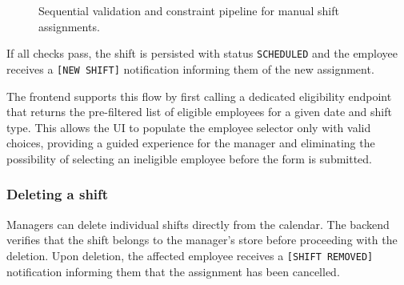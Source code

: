 \begin{figure}[!h]
    \caption{Sequential validation and constraint pipeline for manual shift assignments.}
    \label{fig:manual_assignment_pipeline}
\end{figure}

\par If all checks pass, the shift is persisted with status \texttt{SCHEDULED} and the employee receives a \texttt{[NEW SHIFT]} notification informing them of the new assignment.

\par The frontend supports this flow by first calling a dedicated eligibility endpoint that returns the pre-filtered list of eligible employees for a given date and shift type. This allows the UI to populate the employee selector only with valid choices, providing a guided experience for the manager and eliminating the possibility of selecting an ineligible employee before the form is submitted.

\subsubsection*{Deleting a shift}
\par Managers can delete individual shifts directly from the calendar. The backend verifies that the shift belongs to the manager's store before proceeding with the deletion. Upon deletion, the affected employee receives a \texttt{[SHIFT REMOVED]} notification informing them that the assignment has been cancelled.


